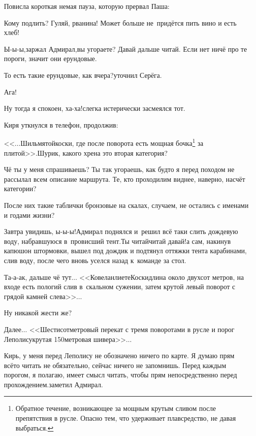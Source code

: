 Повисла короткая немая пауза, которую прервал Паша:

\diagdash Кому подлить? Гуляй, рванина! Может больше не~придётся пить вино и есть хлеб!

\diagdash Ы-ы-ы,\mdash заржал Адмирал,\mdash вы угораете? Давай дальше читай. Если нет ничё про те пороги, значит они ерундовые.

\diagdash То есть такие ерундовые, как вчера?\mdash уточнил Серёга.

\diagdash Ага!

\diagdash Ну тогда я спокоен, ха-ха!\mdash слегка истерически засмеялся тот.

Киря уткнулся в телефон, продолжив:

\renewcommand*{\thefootnote}{\fnsymbol{footnote}}
\setcounter{footnote}{0}
\diagdash <<$\ldots$Шильмятойкоски, где после поворота есть мощная бочка\footnote{Обратное течение, возникающее за мощным крутым сливом после препятствия в русле. Опасно тем, что удерживает плавсредство, не давая выбраться.} за плитой>>.\mdash Шурик, какого хрена это вторая категория?

\diagdash Чё ты у меня спрашиваешь? Ты так угораешь, как будто я перед походом не рассылал всем описание маршрута. Те, кто проходил\mdash им виднее, наверно, насчёт категории? 

\diagdash После них такие таблички бронзовые на скалах, случаем, не остались с именами и годами жизни?

\diagdash Завтра увидишь, ы-ы-ы!\mdash Адмирал поднялся и~решил всё таки слить дождевую воду, набравшуюся в~провисший тент.\mdash Ты читай\sdash читай давай!\mdash а сам, накинув капюшон штормовки, вышел под дождик и подтянул оттяжки тента карабинами, слив воду, после чего вновь уселся назад к~команде за стол.

\diagdash Та-а-ак, дальше чё тут$\ldots$ <<Ковеланлиете\sdash Коски\mdash длина около двухсот метров, на входе есть пологий слив в~скальном сужении, затем крутой левый поворот с грядой камней слева>>$\ldots$

\diagdash Ну никакой жести же?

\diagdash Далее$\ldots$ <<Шестисотметровый перекат с тремя поворотами в русле и порог Леполису\mdash крутая 150\sdash метровая шивера>>$\ldots$

\diagdash Кирь, у меня перед Леполису не обозначено ничего по карте. Я думаю прям всё\sdash то читать не обязательно, сейчас ничего не запомнишь. Перед каждым порогом, я полагаю, имеет смысл читать, чтобы прям непосредственно перед прохождением.\mdash заметил Адмирал.

